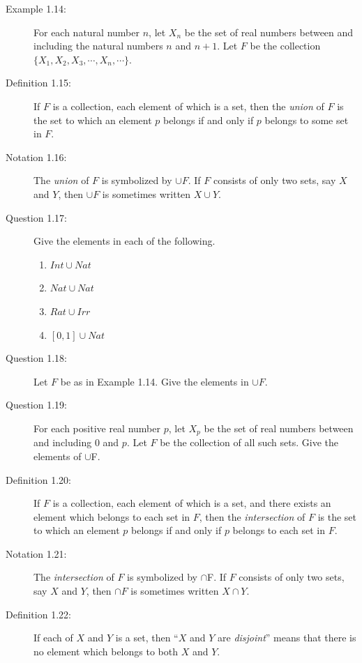 \documentclass{book}
\begin{document}
\begin{description}

\item[Example 1.14:] For each natural number $n$, let $X_{n}$ be the set of real numbers between and including the natural numbers $n$ and $n+1$. Let $F$ be the collection $\{ X_{1}, X_{2}, X_{3}, \cdots , X_{n}, \cdots \}$.

\item[Definition 1.15:] If $F$ is a collection, each element of which is a set, then the \emph{union} of $F$ is the set to which an element $p$ belongs if and only if $p$ belongs to some set in $F$.

\item[Notation 1.16:] The \emph{union} of $F$ is symbolized by $\cup F$. If $F$ consists of only two sets, say $X$ and $Y$, then $\cup F$ is sometimes written $X \cup Y$.

\item[Question 1.17:] Give the elements in each of the following.
\begin{enumerate}[\hspace{1cm}(a)]
  \item $Int \cup Nat$
  \item $Nat \cup Nat$
  \item $Rat \cup Irr$
  \item $[0,1] \cup Nat$
\end{enumerate}

\item[Question 1.18:] Let $F$ be as in Example 1.14. Give the elements in $\cup F$.

\item[Question 1.19:] For each positive real number $p$, let $X_{p}$ be the set of real numbers between and including $0$ and $p$. Let $F$ be the collection of all such sets. Give the elements of $\cup $F.

\item[Definition 1.20:] If $F$ is a collection, each element of which is a set, and there exists an element which belongs to each set in $F$, then the \emph{intersection} of $F$ is the set to which an element $p$ belongs if and only if $p$ belongs to each set in $F$.

\item[Notation 1.21:] The \emph{intersection} of $F$ is symbolized by $\cap $F. If $F$ consists of only two sets, say $X$ and $Y$, then $\cap F$ is sometimes written $X \cap Y$.

\item[Definition 1.22:] If each of $X$ and $Y$ is a set, then ``$X$ and $Y$ are \emph{disjoint}'' means that there is no element which belongs to both $X$ and $Y$.


\end{description}
\end{document}
